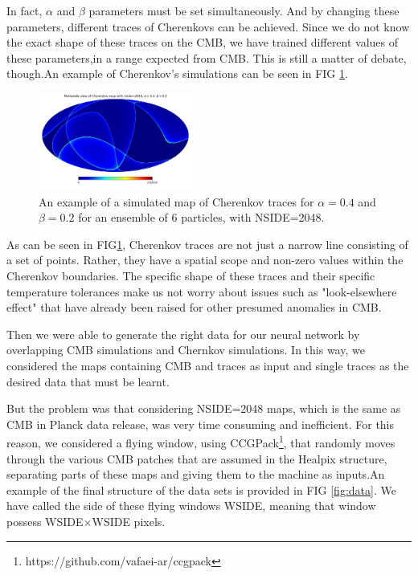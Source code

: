 \documentclass[10pt, english, pra,aps,twocolumn,floatfix,superscriptaddress]{revtex4-2}
\begin{document}
 In fact, $\alpha$ and $\beta$ parameters must be set simultaneously. And by changing these parameters, different traces of Cherenkovs can be achieved. Since we do not know the exact shape of these traces on the CMB, we have trained different values of these parameters,in a range expected from CMB. This is still a matter of debate, though.An example of Cherenkov's simulations can be seen in FIG \ref{fig:cherenkov}.
 
   \begin{figure}
     \centering
     \includegraphics[width=0.45\textwidth]{Cherenkov.jpg}
     \caption{An example of a simulated map of Cherenkov traces for $\alpha = 0.4$ and $\beta = 0.2$ for an ensemble of 6 particles, with NSIDE=2048.}
     \label{fig:cherenkov}
 \end{figure}
 
 
 As can be seen in FIG\ref{fig:cherenkov}, Cherenkov traces are not just a narrow line consisting of a set of points. Rather, they have a spatial scope and non-zero values within the Cherenkov boundaries. The specific shape of these traces and their specific temperature tolerances make us not worry about issues such as "look-elsewhere effect" that have already been raised for other presumed anomalies in CMB\cite{Anomaly,Moss_2011}.
 
 Then we were able to generate the right data for our neural network by overlapping CMB simulations and Chernkov simulations. In this way, we considered the maps containing CMB and traces as input and single traces as the desired data that must be learnt.
 
 But the problem was that considering NSIDE=2048 maps, which is the same as CMB in Planck data release, was very time consuming and inefficient. For this reason, we considered a flying window, using CCGPack\footnote{https://github.com/vafaei-ar/ccgpack}, that randomly moves through the various CMB patches that are assumed in the Healpix structure, separating parts of these maps and giving them to the machine as inputs.An example of the final structure of the data sets is provided in FIG \ref{fig:data}. We have called the side of these flying windows WSIDE, meaning that window possess WSIDE$\times$WSIDE pixels.
 
\end{document}
